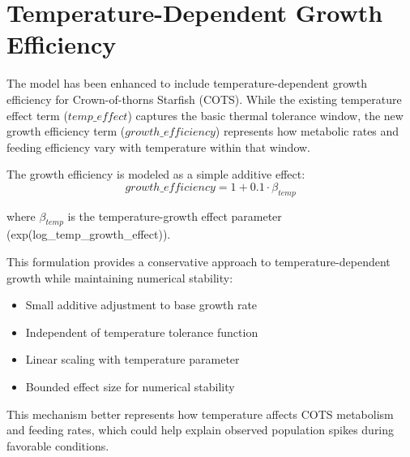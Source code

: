 \section{Temperature-Dependent Growth Efficiency}

The model has been enhanced to include temperature-dependent growth efficiency for Crown-of-thorns Starfish (COTS). While the existing temperature effect term ($temp\_effect$) captures the basic thermal tolerance window, the new growth efficiency term ($growth\_efficiency$) represents how metabolic rates and feeding efficiency vary with temperature within that window.

The growth efficiency is modeled as a simple additive effect:
\[
growth\_efficiency = 1 + 0.1 \cdot \beta_{temp}
\]

where $\beta_{temp}$ is the temperature-growth effect parameter (exp(log\_temp\_growth\_effect)).

This formulation provides a conservative approach to temperature-dependent growth while maintaining numerical stability:
\begin{itemize}
\item Small additive adjustment to base growth rate
\item Independent of temperature tolerance function
\item Linear scaling with temperature parameter
\item Bounded effect size for numerical stability
\end{itemize}

This mechanism better represents how temperature affects COTS metabolism and feeding rates, which could help explain observed population spikes during favorable conditions.
